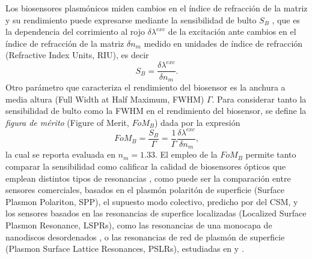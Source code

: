 Los biosensores plasmónicos miden cambios en el índice de refracción de la matriz y su rendimiento puede expresarse mediante la sensibilidad de bulto $S_B$ \cite{estevez2014trends,svedendahl2009refractometric}, que es la dependencia del corrimiento al rojo $\delta \lambda^{exc}$ de la excitación ante cambios en el índice de refracción de la matriz $\delta n_m$ medido en unidades de índice de refracción (Refractive Index Units, RIU), es decir
%
	\begin{equation}
	S_B = \frac{\delta \lambda^{exc}}{\delta n_m}.
	\label{eq:SBulk}
	\end{equation}
%
Otro parámetro que caracteriza el rendimiento del biosensor es la anchura a media altura (Full Width at Half Maximum, FWHM) $\Gamma$. Para considerar tanto la sensibilidad de bulto como la FWHM en el rendimiento del biosensor, se define la \emph{figura de mérito} (Figure of Merit, $\textit{FoM}_B$) dada por la expresión
%
	\begin{equation}
	\textit{FoM}_B = \frac{S_B}{\Gamma}
			=\frac{1}{\Gamma}\frac{\delta \lambda^{exc}}{\delta n_m},
	\label{eq:FoM}
	\end{equation}
%
la cual se reporta evaluada en $n_m=1.33$. El empleo de la $\textit{FoM}_B$ permite tanto comparar  la sensibilidad como calificar la calidad de biosensores ópticos que emplean distintos tipos de resonancias \cite{svedendahl2009refractometric}, como puede ser la comparación entre sensores comerciales, basados en el plasmón polaritón de superficie (Surface Plasmon Polariton, SPP), el supuesto modo colectivo, predicho por del CSM, y los sensores basados en las resonancias de superfice localizadas (Localized Surface Plasmon Resonance, LSPRs), como las resonancias de una monocapa de nanodiscos desordenados \cite{svedendahl2009refractometric}, o las resonancias de red de plasmón de superficie (Plasmon Surface Lattice Resonances, PSLRs), estudiadas en \cite{kabashin2009plasmonic} y \cite{danilov2018ultra}.

